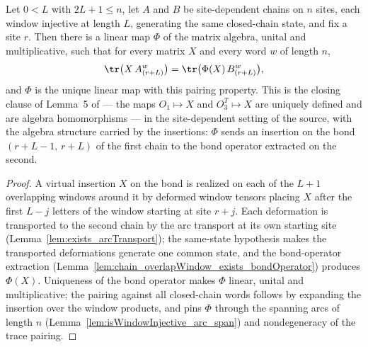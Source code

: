\begin{lemma}%
    \label{lem:chain_exists_insertionHom}
    \leanok
    Let $0 < L$ with $2L + 1 \le n$, let $A$ and $B$ be site-dependent
    chains on $n$ sites, each window injective at length $L$, generating
    the same closed-chain state, and fix a site $r$.  Then there is a
    linear map $\Phi$ of the matrix algebra, unital and multiplicative,
    such that for every matrix $X$ and every word $w$ of length $n$,
    \[
        \tr\bigl(X\, A_{(r+L)}^{w}\bigr)
        = \tr\bigl(\Phi(X)\, B_{(r+L)}^{w}\bigr),
    \]
    and $\Phi$ is the unique linear map with this pairing property.  This
    is the closing clause of Lemma~5 of \cite{Molnar2018NormalPEPS} — the
    maps $O_1 \mapsto X$ and $O_3^T \mapsto X$ are uniquely defined and
    are algebra homomorphisms — in the site-dependent setting of the
    source, with the algebra structure carried by the insertions: $\Phi$
    sends an insertion on the bond $(r+L-1,\, r+L)$ of the first chain to
    the bond operator extracted on the second.
\end{lemma}
\begin{proof}\leanok
    A virtual insertion $X$ on the bond is realized on each of the
    $L + 1$ overlapping windows around it by deformed window tensors
    placing $X$ after the first $L - j$ letters of the window starting at
    site $r + j$.  Each deformation is transported to the second chain by
    the arc transport at its own starting site
    (Lemma~\ref{lem:exists_arcTransport}); the same-state hypothesis
    makes the transported deformations generate one common state, and the
    bond-operator extraction
    (Lemma~\ref{lem:chain_overlapWindow_exists_bondOperator}) produces
    $\Phi(X)$.  Uniqueness of the bond operator makes $\Phi$ linear,
    unital and multiplicative; the pairing against all closed-chain words
    follows by expanding the insertion over the window products, and pins
    $\Phi$ through the spanning arcs of length $n$
    (Lemma~\ref{lem:isWindowInjective_arc_span}) and nondegeneracy of the
    trace pairing.
\end{proof}

